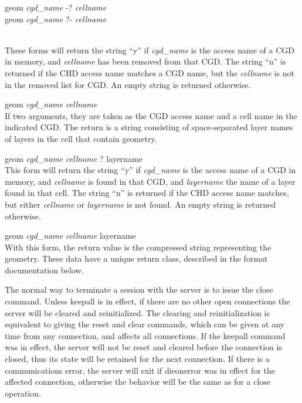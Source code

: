 \begin{description}
\begin{description}
\item\parbox[b]{4in}{{\vt geom} {\it cgd\_name} {\vt -?} {\it cellname}\\
  {\vt geom} {\it cgd\_name} {\vt ?-} {\it cellname}}\\
These forms will return the string ``{\vt y}'' if {\it cgd\_name} is
the access name of a CGD in memory, and {\it cellname} has been
removed from that CGD.  The string ``{\vt n}'' is returned if the CHD
access name matches a CGD name, but the {\it cellname} is not in the
removed list for CGD.  An empty string is returned otherwise.

\item{\vt geom} {\it cgd\_name} {\it cellname}\\
If two arguments, they are taken as the CGD access name and a cell
name in the indicated CGD.  The return is a string consisting of
space-separated layer names of layers in the cell that contain
geometry.

\item{\vt geom} {\it cgd\_name} {\it cellname} {\vt ?} {\vt layername}\\
This form will return the string ``{\vt y}'' if {\it cgd\_name} is the
access name of a CGD in memory, and {\it cellname} is found in that
CGD, and {\it layername} the name of a layer found in that cell.  The
string ``{\vt n}'' is returned if the CHD access name matches, but
either {\it cellname} or {\it layername} is not found.  An empty
string is returned otherwise.

\item{\vt geom} {\it cgd\_name} {\it cellname} {\vt layername}\\
With this form, the return value is the compressed string representing
the geometry.  These data have a unique return class, described in the
format documentation below.
\end{description}
\end{description}

The normal way to terminate a session with the server is to issue the
{\vt close} command.  Unless {\vt keepall} is in effect, if there are
no other open connections the server will be cleared and
reinitialized.  The clearing and reinitialization is equivalent to
giving the {\vt reset} and {\vt clear} commands, which can be given at
any time from any connection, and affects all connections.  If the
{\vt keepall} command was in effect, the server will not be reset and
cleared before the connection is closed, thus its state will be
retained for the next connection.  If there is a communications error,
the server will exit if {\vt dieonerror} was in effect for the
affected connection, otherwise the behavior will be the same as for a
{\vt close} operation.

